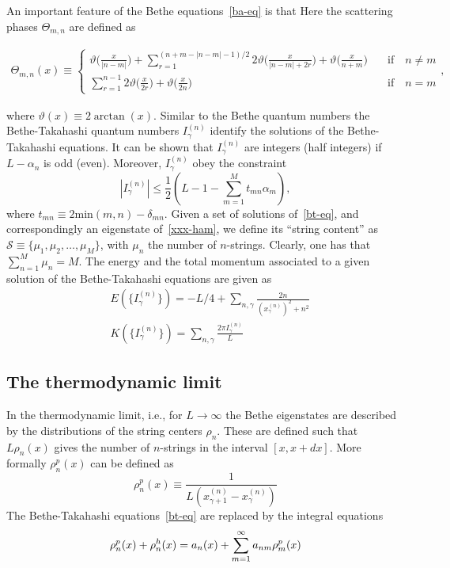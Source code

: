 \documentclass[twocolumn,superscriptaddress,prb,10pt]{revtex4-1}
\begin{document}
An important feature of the Bethe equations~\eqref{ba-eq} is that Here the scattering phases $\Theta_{m,n}$ are defined as 
%
\begin{widetext}
\begin{eqnarray}
\nonumber\Theta_{m,n}(x)\equiv\left\{\begin{array}{cc}
\vartheta\big(\frac{x}{|n-m|}\big)+\!\!\!\!\!\sum
\limits_{r=1}^{(n+m-|n-m|-1)/2}\!\!\!\!\!2\vartheta\big(\frac{x}
{|n-m|+2r}\big)+\vartheta\big(\frac{x}{n+m}\big) & \quad\mbox{if}
\quad n\ne m\\\sum\limits_{r=1}^{n-1}2\vartheta\big(\frac{x}{2r}\big)+
\vartheta\big(\frac{x}{2n}\big) & \quad\mbox{if}\quad n=m
\end{array}\right.,
\end{eqnarray}
\end{widetext}
%
where $\vartheta(x)\equiv 2\arctan(x)$. Similar to the Bethe quantum numbers 
the Bethe-Takahashi quantum numbers $I_{\gamma}^{(n)}$ identify the solutions 
of the Bethe-Takahashi equations. It can be shown that $I_\gamma^{(n)}$ are 
integers (half integers) if $L-\alpha_n$ is odd (even). Moreover, 
$I_\gamma^{(n)}$ obey the constraint 
%
\begin{equation}
\label{bt-bounds}
|I_\gamma^{(n)}|\le\frac{1}{2}(L-1-\sum\limits_{m=1}^Mt_{mn}\alpha_m),
\end{equation}
%
where $t_{mn}\equiv 2\textrm{min}(m,n)-\delta_{mn}$. 
Given a set of solutions of~\eqref{bt-eq}, and correspondingly an eigenstate 
of~\eqref{xxx-ham}, we define its ``string content'' as ${\mathcal S}\equiv
\{\mu_1,\mu_2,\dots,\mu_M\}$, with $\mu_n$ the number of $n$-strings. Clearly, 
one has that $\sum_{n=1}^M\mu_n=M$. The energy and the total momentum 
associated to a given solution of the Bethe-Takahashi equations are given as 
%
\begin{align}
& E(\{I_\gamma^{(n)}\})=-L/4+\sum\limits_{n,\gamma}\frac{2n}{
(x_\gamma^{(n)})^2+n^2}\\
& K(\{I_\gamma^{(n)}\})=\sum\limits_{n,\gamma}\frac{2\pi 
I_\gamma^{(n)}}{L}
\end{align}
%

\subsection{The thermodynamic limit}

In the thermodynamic limit, i.e., for $L\to\infty$ the Bethe eigenstates are 
described by the distributions of the string centers $\rho_n$. 
These are defined such that $L\rho_n(x)$ gives the number of $n$-strings in the 
interval $[x,x+dx]$. More formally $\rho^p_n(x)$ can be defined as 
%
\begin{equation}
\label{rho-n}
\rho^p_n(x)\equiv\frac{1}{L(x_{\gamma+1}^{(n)}-x_\gamma^{(n)})}
\end{equation}
%
The Bethe-Takahashi equations~\eqref{bt-eq} are replaced by the integral 
equations 
%
\begin{equation}
\rho^p_n(x)+\rho_n^h(x)=a_n(x)+\sum\limits_{m=1}^\infty a_{nm}\*\rho^p_m(x)
\end{equation}
%
\end{document}
